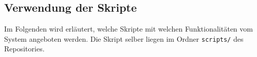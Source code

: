 \begin{appendices}

\section{Verwendung der Skripte}
Im Folgenden wird erläutert, welche Skripte mit welchen Funktionalitäten vom System angeboten werden. Die Skript selber liegen im Ordner \texttt{scripts/} des Repositories.


\end{appendices}
